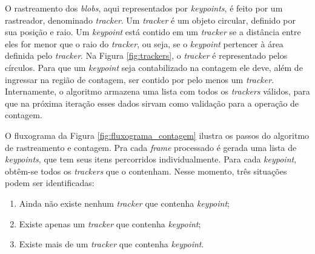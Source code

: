 
O rastreamento dos \textit{blobs}, aqui representados por \textit{keypoints}, é feito por um rastreador, denominado \textit{tracker}. Um \textit{tracker} é um objeto circular, definido por sua posição e raio. Um \textit{keypoint} está contido em um \textit{tracker} se a distância entre eles for menor que o raio do \textit{tracker}, ou seja, se o \textit{keypoint} pertencer à área definida pelo \textit{tracker}. Na Figura \ref{fig:trackers}, o \textit{tracker} é representado pelos círculos. Para que um \textit{keypoint} seja contabilizado na contagem ele deve, além de ingressar na região de contagem, ser contido por pelo menos um \textit{tracker}. Internamente, o algoritmo armazena uma lista com todos os \textit{trackers} válidos, para que na próxima iteração esses dados sirvam como validação para a operação de contagem.

O fluxograma da Figura \ref{fig:fluxograma_contagem} ilustra os passos do algoritmo de rastreamento e contagem. Pra cada \textit{frame} processado é gerada uma lista de \textit{keypoints}, que tem seus itens percorridos individualmente. Para cada \textit{keypoint}, obtêm-se todos os \textit{trackers} que o contenham. Nesse momento, três situações podem ser identificadas:

\begin{enumerate}
  \item Ainda não existe nenhum \textit{tracker} que contenha \textit{keypoint};
  \item Existe apenas um \textit{tracker} que contenha \textit{keypoint};
  \item Existe mais de um \textit{tracker} que contenha \textit{keypoint}.
\end{enumerate}

